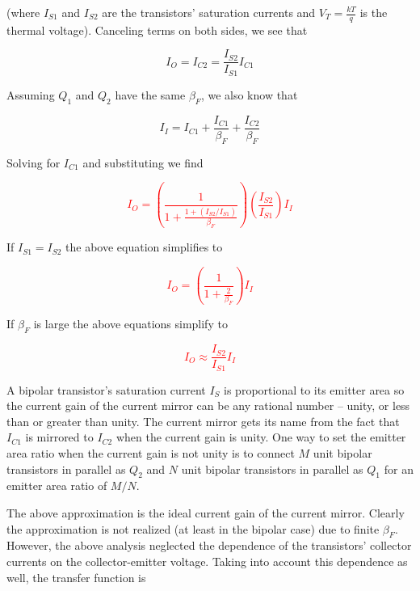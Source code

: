 (where $I_{S1}$ and $I_{S2}$ are the transistors' saturation currents and $V_{T} = \frac{kT}{q}$ is the thermal voltage). Canceling terms on both sides, we see that

\begin{equation}
I_{O} = I_{C2} = \frac{I_{S2}}{I_{S1}}I_{C1}
\end{equation}

Assuming $Q_{1}$ and $Q_{2}$ have the same $\beta_{F}$, we also know that

\begin{equation}
I_{I} = I_{C1} + \frac{I_{C1}}{\beta_{F}} + \frac{I_{C2}}{\beta_{F}}
\end{equation}

Solving for $I_{C1}$ and substituting we find

\textcolor{red}{
\begin{equation}
I_{O} = \left(\frac{1}{1+\frac{1+(I_{S2}/I_{S1})}{\beta_{F}}}\right)\left(\frac{I_{S2}}{I_{S1}}\right)I_{I}
\label{eq:simplecurrentmirror}
\end{equation}
}

If $I_{S1} = I_{S2}$ the above equation simplifies to

\textcolor{red}{
\begin{equation}
I_{O} = \left(\frac{1}{1 + \frac{2}{\beta_{F}}}\right)I_{I}
\label{eq:simplecurrentmirror_Is_equal}
\end{equation}
}

If $\beta_{F}$ is large the above equations simplify to

\textcolor{red}{
\begin{equation}
I_{O} \approx \frac{I_{S2}}{I_{S1}}I_{I}
\label{eq:simplecurrentmirror_Beta_large}
\end{equation}
}

\par
A bipolar transistor's saturation current $I_{S}$ is proportional to its emitter area so the current gain of the current mirror can be any rational number -- unity, or less than or greater than unity. The current mirror gets its name from the fact that $I_{C1}$ is mirrored to $I_{C2}$ when the current gain is unity. One way to set the emitter area ratio when the current gain is not unity is to connect $M$ unit bipolar transistors in parallel as $Q_{2}$ and $N$ unit bipolar transistors in parallel as $Q_{1}$ for an emitter area ratio of $M/N$.
\par
The above approximation is the ideal current gain of the current mirror. Clearly the approximation is not realized (at least in the bipolar case) due to finite $\beta_{F}$. However, the above analysis neglected the dependence of the transistors' collector currents on the collector-emitter voltage. Taking into account this dependence as well, the transfer function is

